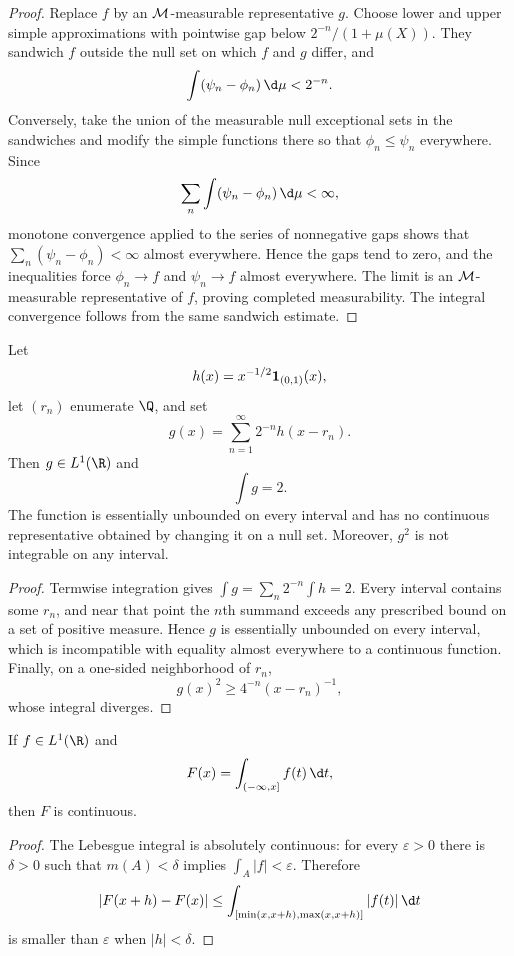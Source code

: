 \begin{proof}
Replace $f$ by an $\mathcal{M}$-measurable representative $g$. Choose lower and upper simple approximations with pointwise gap below $2^{-n}/(1+\mu(X))$. They sandwich $f$ outside the null set on which $f$ and $g$ differ, and
\[
\int(\psi_n-\phi_n)\,\d\mu<2^{-n}.
\]
Conversely, take the union of the measurable null exceptional sets in the sandwiches and modify the simple functions there so that $\phi_n\leq\psi_n$ everywhere. Since
\[
\sum_n\int(\psi_n-\phi_n)\,\d\mu<\infty,
\]
monotone convergence applied to the series of nonnegative gaps shows that $\sum_n(\psi_n-\phi_n)<\infty$ almost everywhere. Hence the gaps tend to zero, and the inequalities force $\phi_n\to f$ and $\psi_n\to f$ almost everywhere. The limit is an $\mathcal{M}$-measurable representative of $f$, proving completed measurability. The integral convergence follows from the same sandwich estimate.
\end{proof}

\begin{eg}
Let
\[
h(x)=x^{-1/2}\mathbf{1}_{(0,1)}(x),
\]
let $(r_n)$ enumerate $\Q$, and set
\[
g(x)=\sum_{n=1}^{\infty}2^{-n}h(x-r_n).
\]
Then $g\in L^1(\R)$ and
\[
\int g=2.
\]
The function is essentially unbounded on every interval and has no continuous representative obtained by changing it on a null set. Moreover, $g^2$ is not integrable on any interval.
\end{eg}

\begin{proof}
Termwise integration gives $\int g=\sum_n2^{-n}\int h=2$. Every interval contains some $r_n$, and near that point the $n$th summand exceeds any prescribed bound on a set of positive measure. Hence $g$ is essentially unbounded on every interval, which is incompatible with equality almost everywhere to a continuous function. Finally, on a one-sided neighborhood of $r_n$,
\[
g(x)^2\geq4^{-n}(x-r_n)^{-1},
\]
whose integral diverges.
\end{proof}

\begin{thm}
If $f\in L^1(\R)$ and
\[
F(x)=\int_{(-\infty,x]}f(t)\,\d t,
\]
then $F$ is continuous.
\end{thm}

\begin{proof}
The Lebesgue integral is absolutely continuous: for every $\varepsilon>0$ there is $\delta>0$ such that $m(A)<\delta$ implies $\int_A|f|<\varepsilon$. Therefore
\[
|F(x+h)-F(x)|
 \leq\int_{[\min(x,x+h),\max(x,x+h)]}|f(t)|\,\d t
\]
is smaller than $\varepsilon$ when $|h|<\delta$.
\end{proof}

